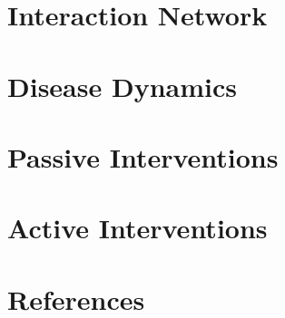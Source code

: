 \documentclass[11pt, oneside]{amsart}   	%
\begin{document}
\section{Interaction Network}

\section{Disease Dynamics}

\section{Passive Interventions}

\section{Active Interventions}

\section{References}
\end{document}
